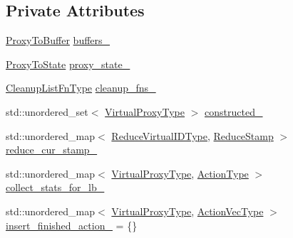 \subsection*{Private Attributes}
\begin{DoxyCompactItemize}
\item 
\hyperlink{structvt_1_1vrt_1_1collection_1_1_collection_manager_a8229b3026c5790ed0783bd34c404e359}{Proxy\+To\+Buffer} \hyperlink{structvt_1_1vrt_1_1collection_1_1_collection_manager_aca3063c9343d57284746de0d9f1d9613}{buffers\+\_\+}
\item 
\hyperlink{structvt_1_1vrt_1_1collection_1_1_collection_manager_a47acf9cd5a988ba197fbef5097f75dde}{Proxy\+To\+State} \hyperlink{structvt_1_1vrt_1_1collection_1_1_collection_manager_a5bafa0103098ee13e3b3653431e2657d}{proxy\+\_\+state\+\_\+}
\item 
\hyperlink{structvt_1_1vrt_1_1collection_1_1_collection_manager_a735e54bc5a8646536d07750e2549a156}{Cleanup\+List\+Fn\+Type} \hyperlink{structvt_1_1vrt_1_1collection_1_1_collection_manager_a5123370561fb8eb70ef7c4979e051706}{cleanup\+\_\+fns\+\_\+}
\item 
std\+::unordered\+\_\+set$<$ \hyperlink{namespacevt_a1b417dd5d684f045bb58a0ede70045ac}{Virtual\+Proxy\+Type} $>$ \hyperlink{structvt_1_1vrt_1_1collection_1_1_collection_manager_a0718b47f3415e6d189f8a76068429d5c}{constructed\+\_\+}
\item 
std\+::unordered\+\_\+map$<$ \hyperlink{structvt_1_1vrt_1_1collection_1_1_collection_manager_ae820c8c22ae8c7350fa0232e0749b097}{Reduce\+Virtual\+I\+D\+Type}, \hyperlink{structvt_1_1vrt_1_1collection_1_1_collection_manager_ae8aac19e0ae07e9225142e5880eac830}{Reduce\+Stamp} $>$ \hyperlink{structvt_1_1vrt_1_1collection_1_1_collection_manager_a5bf3bcab36addad323a03746928dfac8}{reduce\+\_\+cur\+\_\+stamp\+\_\+}
\item 
std\+::unordered\+\_\+map$<$ \hyperlink{namespacevt_a1b417dd5d684f045bb58a0ede70045ac}{Virtual\+Proxy\+Type}, \hyperlink{namespacevt_ae0a5a7b18cc99d7b732cb4d44f46b0f3}{Action\+Type} $>$ \hyperlink{structvt_1_1vrt_1_1collection_1_1_collection_manager_a916d623a447d0029f62549b25ddce64e}{collect\+\_\+stats\+\_\+for\+\_\+lb\+\_\+}
\item 
std\+::unordered\+\_\+map$<$ \hyperlink{namespacevt_a1b417dd5d684f045bb58a0ede70045ac}{Virtual\+Proxy\+Type}, \hyperlink{structvt_1_1vrt_1_1collection_1_1_collection_manager_a51650235f0e53ae08381942eba822679}{Action\+Vec\+Type} $>$ \hyperlink{structvt_1_1vrt_1_1collection_1_1_collection_manager_a6d72877052bc73fa06faacb2161cd57d}{insert\+\_\+finished\+\_\+action\+\_\+} = \{\}

\end{DoxyCompactItemize}
